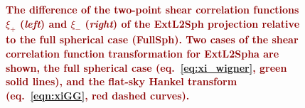 \documentclass[fleqn,usenatbib]{mnras} %
\newcommand{\forref}[1]{{\bf\textcolor{darkred}{#1}}}
\begin{document}
\begin{figure}

  \begin{center}
  \end{center}

  \caption{%
    \forref{The difference of the two-point shear correlation functions $\xi_+$ (\emph{left}) and $\xi_-$ (\emph{right})
    of the ExtL2Sph projection relative to the full spherical case (FullSph). Two cases of the shear correlation function transformation for
    ExtL2Spha are shown,
    the full spherical case (eq.~\ref{eq:xi_wigner}, green solid lines), and the flat-sky Hankel transform (eq.~\ref{eqn:xiGG}, red dashed curves).}
  }

  \label{fig:xi_p_wigner}

\end{figure}
\end{document}
